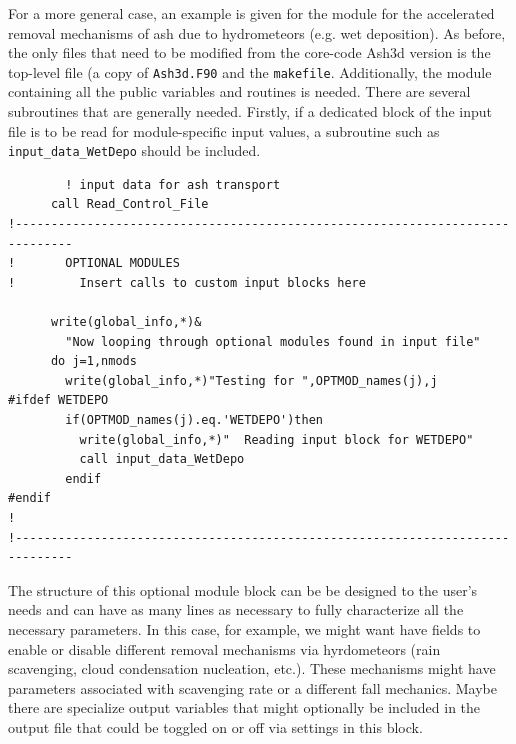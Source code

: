 For a more general case, an example is given for the module for the accelerated
removal mechanisms of ash due to hydrometeors (e.g. wet deposition).  As before,
the only files that need to be modified from the core-code Ash3d version is the
top-level file (a copy of \texttt{Ash3d.F90} and the \texttt{makefile}.  Additionally,
the module containing all the public variables and routines is needed.  There are
several subroutines that are generally needed.  Firstly, if a dedicated block of
the input file is to be read for module-specific input values, a subroutine such
as \texttt{input\_data\_WetDepo} should be included.

\small
\begin{verbatim}
        ! input data for ash transport
      call Read_Control_File
!------------------------------------------------------------------------------
!       OPTIONAL MODULES
!         Insert calls to custom input blocks here

      write(global_info,*)&
        "Now looping through optional modules found in input file"
      do j=1,nmods
        write(global_info,*)"Testing for ",OPTMOD_names(j),j
#ifdef WETDEPO
        if(OPTMOD_names(j).eq.'WETDEPO')then
          write(global_info,*)"  Reading input block for WETDEPO"
          call input_data_WetDepo
        endif
#endif
!
!------------------------------------------------------------------------------
\end{verbatim}
\normalsize
The structure of this optional module block can be be designed to the user's needs
and can have as many lines as necessary to fully characterize all the necessary
parameters. In this case, for example, we might want have fields to enable or
disable different removal mechanisms via hyrdometeors (rain scavenging, cloud
condensation nucleation, etc.). These mechanisms might have parameters associated
with scavenging rate or a different fall mechanics. Maybe there are specialize
output variables that might optionally be included in the output file that could
be toggled on or off via settings in this block.


